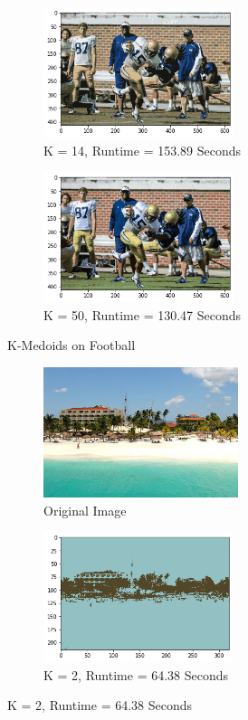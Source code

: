 \documentclass[twoside,10pt]{article}
\begin{document}
\begin{enumerate}
\begin{itemize}
\begin{itemize}
\begin{figure}
\begin{subfigure}{.5\textwidth}
  \centering
  \includegraphics[height=1.5in]{Images/footballkmedoids14.png}  
  \caption{K = 14, Runtime = 153.89 Seconds}
  \label{fig:sub-third}
\end{subfigure}
\begin{subfigure}{.5\textwidth}
  \centering
  \includegraphics[height=1.5in]{Images/footballkmedoids50.png}  
  \caption{K = 50, Runtime = 130.47 Seconds}
  \label{fig:sub-fourth}
\end{subfigure}
\caption{K-Medoids on Football}
\label{fig:fig}
\end{figure}  

\begin{figure}
\begin{subfigure}{.5\textwidth}
  \centering
  \includegraphics[height=1.5in]{Images/beach.png}  
  \caption{Original Image}
  \label{fig:sub-first}
\end{subfigure}
\begin{subfigure}{.5\textwidth}
  \centering
  \includegraphics[height=1.5in]{Images/beachkmedoids2.png}  
  \caption{K = 2, Runtime = 64.38 Seconds}
  \label{fig:sub-second}
\end{subfigure}


\end{figure}
\end{itemize}
\end{itemize}
\end{enumerate}
\end{document}
